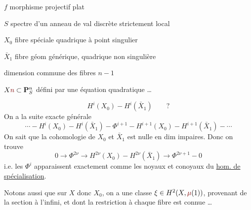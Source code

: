 $f$ morphisme projectif plat

$S$ spectre d'un anneau de val discrète strictement local

$X_0$ fibre spéciale quadrique à point singulier

$\bar X_1$ fibre géom générique, quadrique non singulière

dimension commune des fibres $n-1$

\unsure{\big[}
$X\deleted{\unsure{n}}\subset\mathbf P^n_S$ défini par une équation quadratique \ldots

\[
H^i(X_0)\mathbin{-}H^i(\bar X_1)\qquad ?
\]
On a la suite exacte générale
\[
\cdots\mathbin{-}H^i(X_0)\mathbin{-}H^i(\bar X_1)
\mathbin{-}\Phi^{i+1}\mathbin{-}H^{i+1}(X_0)
\mathbin{-}H^{i+1}(\bar X_1)\mathbin{-}\cdots
\]
On sait que la cohomologie de 
$X_0$ et $\bar X_1$ est nulle en dim impaires. Donc
on trouve
\[
0\longrightarrow\Phi^{2\nu}\longrightarrow H^{2\nu}(X_0)
\mathbin{-}H^{2\nu}(\bar X_1)\longrightarrow\Phi^{2\nu+1}\mathbin{-}0
\]
i.e. les $\Phi^i$ apparaissent exactement comme les
noyaux et conoyaux du \uline{hom. de spécialisation}.

Notons aussi que sur $X$ donc $X_0$, on a une
classe $\xi\in H^2(X,\unsure{\mu}(1))$, provenant de la section
à l'infini, et dont la restriction à chaque fibre
est connue \ldots
{}
